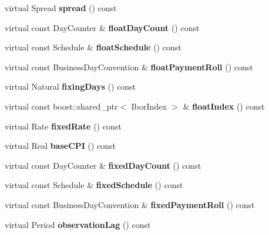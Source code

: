 \begin{DoxyCompactItemize}
\item 
virtual Spread {\bfseries spread} () const \label{class_quant_lib_1_1_c_p_i_swap_a969f252097580481603da47850c01fef}

\item 
virtual const Day\+Counter \& {\bfseries float\+Day\+Count} () const \label{class_quant_lib_1_1_c_p_i_swap_a3d5586a3237929be69ae5338d67bc980}

\item 
virtual const Schedule \& {\bfseries float\+Schedule} () const \label{class_quant_lib_1_1_c_p_i_swap_a38100daa48f8a2902ef67ef3a8dea17d}

\item 
virtual const Business\+Day\+Convention \& {\bfseries float\+Payment\+Roll} () const \label{class_quant_lib_1_1_c_p_i_swap_a532dc52928dce56aed42f3e01dc87c13}

\item 
virtual Natural {\bfseries fixing\+Days} () const \label{class_quant_lib_1_1_c_p_i_swap_a0a63fd5bc2212cf35499780a64ed36de}

\item 
virtual const boost\+::shared\+\_\+ptr$<$ Ibor\+Index $>$ \& {\bfseries float\+Index} () const \label{class_quant_lib_1_1_c_p_i_swap_a7b5682023ca32bf850c54805b7e57686}

\item 
virtual Rate {\bfseries fixed\+Rate} () const \label{class_quant_lib_1_1_c_p_i_swap_a64f2e96cd41400901de013b80a6cbbe4}

\item 
virtual Real {\bfseries base\+C\+PI} () const \label{class_quant_lib_1_1_c_p_i_swap_a1f4862a14c6b56417e0221280dbe483a}

\item 
virtual const Day\+Counter \& {\bfseries fixed\+Day\+Count} () const \label{class_quant_lib_1_1_c_p_i_swap_a895d969d3106054cbf4c8e750b2067e1}

\item 
virtual const Schedule \& {\bfseries fixed\+Schedule} () const \label{class_quant_lib_1_1_c_p_i_swap_a5b5147ef4ecd016d3e7d23d30d41aeee}

\item 
virtual const Business\+Day\+Convention \& {\bfseries fixed\+Payment\+Roll} () const \label{class_quant_lib_1_1_c_p_i_swap_a3a71e86b4026ee02578a6cc4614c52e1}

\item 
virtual Period {\bfseries observation\+Lag} () const \label{class_quant_lib_1_1_c_p_i_swap_aa24d913c77d53852b5589f59911f800b}


\end{DoxyCompactItemize}
